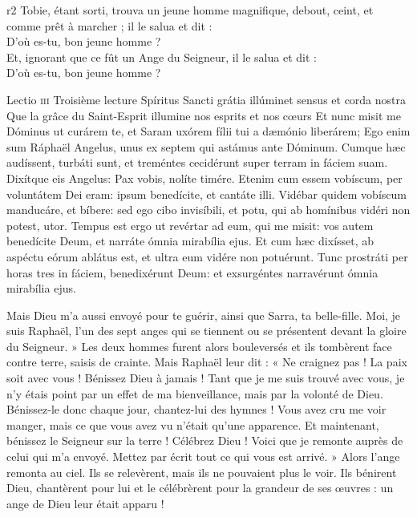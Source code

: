 \documentclass[twoside]{article}
\begin{document}
\begin{paracol}[1]{2}
{	}
	{r2}
	{\rr Tobie, étant sorti, trouva un jeune homme magnifique, debout, ceint, et comme prêt à marcher ; il le salua et dit :\\
	\GreSpecial{*} D’où es-tu, bon jeune homme ?\\
	\vv Et, ignorant que ce fût un Ange du Seigneur, il le salua et dit :\\
	\GreSpecial{*} D’où es-tu, bon jeune homme ?}

\lectioresponsorium
	{Lectio \textsc{iii}}
	{Troisième lecture}
	{Spíritus Sancti grátia illúminet sensus et corda nostra}
	{Que la grâce du Saint-Esprit illumine nos esprits et nos cœurs}
	{
		Et nunc misit me Dóminus ut curárem te, et Saram uxórem fílii tui a dæmónio liberárem;
		Ego enim sum Ráphaël Angelus, unus ex septem qui astámus ante Dóminum.
		Cumque hæc audíssent, turbáti sunt, et treméntes cecidérunt super terram in fáciem suam.
		Dixítque eis Angelus: Pax vobis, nolíte timére.
		Etenim cum essem vobíscum, per voluntátem Dei eram: ipsum benedícite, et cantáte illi.
		Vidébar quidem vobíscum manducáre, et bíbere: sed ego cibo invisíbili, et potu, qui ab homínibus vidéri non potest, utor.
		Tempus est ergo ut revértar ad eum, qui me misit: vos autem benedícite Deum, et narráte ómnia mirabília ejus.
		Et cum hæc dixísset, ab aspéctu eórum ablátus est, et ultra eum vidére non potuérunt.
		Tunc prostráti per horas tres in fáciem, benedixérunt Deum: et exsurgéntes narravérunt ómnia mirabília ejus.
	}
	{	
	
		
		Mais Dieu m’a aussi envoyé pour te guérir, ainsi que Sarra, ta belle-fille.
		Moi, je suis Raphaël, l’un des sept anges qui se tiennent ou se présentent devant la gloire du Seigneur. »
		Les deux hommes furent alors bouleversés et ils tombèrent face contre terre, saisis de crainte.
		Mais Raphaël leur dit : « Ne craignez pas ! La paix soit avec vous ! Bénissez Dieu à jamais !
		Tant que je me suis trouvé avec vous, je n’y étais point par un effet de ma bienveillance, mais par la volonté de Dieu. Bénissez-le donc chaque jour, chantez-lui des hymnes !
		Vous avez cru me voir manger, mais ce que vous avez vu n’était qu’une apparence.
		Et maintenant, bénissez le Seigneur sur la terre ! Célébrez Dieu ! Voici que je remonte auprès de celui qui m’a envoyé. Mettez par écrit tout ce qui vous est arrivé. » 
		Alors l’ange remonta au ciel.
		Ils se relevèrent, mais ils ne pouvaient plus le voir.
		Ils bénirent Dieu, chantèrent pour lui et le célébrèrent pour la grandeur de ses œuvres : un ange de Dieu leur était apparu !
	
}
\end{paracol}
\end{document}
